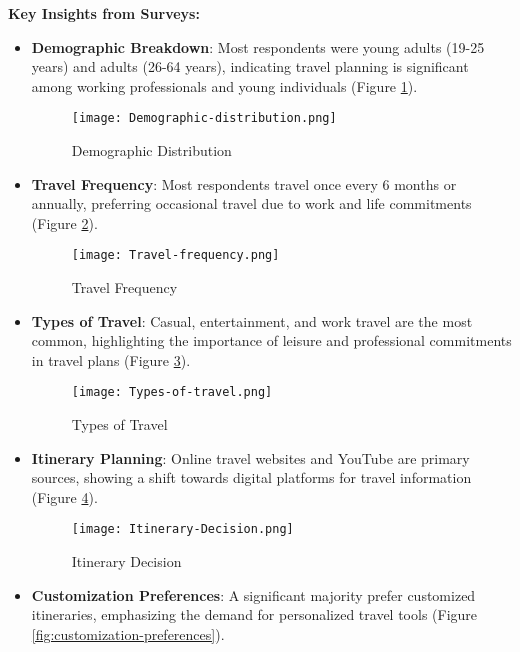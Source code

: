 \documentclass[conference]{IEEEtran}
\begin{document}
        \textbf{Key Insights from Surveys:}

        \begin{itemize}
            \item \textbf{Demographic Breakdown}: Most respondents were young adults (19-25 years) and adults (26-64 years), indicating travel planning is significant among working professionals and young individuals (Figure \ref{fig:demographic-distribution}).
            \begin{figure}
                \centering
                \texttt{[image: Demographic-distribution.png]}
                \caption{Demographic Distribution}
                \label{fig:demographic-distribution}
            \end{figure}
            \item \textbf{Travel Frequency}: Most respondents travel once every 6 months or annually, preferring occasional travel due to work and life commitments (Figure \ref{fig:travel-frequency}).
            \begin{figure}
                \centering
                \texttt{[image: Travel-frequency.png]}
                \caption{Travel Frequency}
                \label{fig:travel-frequency}
            \end{figure}
            \item \textbf{Types of Travel}: Casual, entertainment, and work travel are the most common, highlighting the importance of leisure and professional commitments in travel plans (Figure \ref{fig:types-of-travel}).
            \begin{figure}
                \centering
                \texttt{[image: Types-of-travel.png]}
                \caption{Types of Travel}
                \label{fig:types-of-travel}
            \end{figure}
            \item \textbf{Itinerary Planning}: Online travel websites and YouTube are primary sources, showing a shift towards digital platforms for travel information (Figure \ref{fig:itenary-decision}).
            \begin{figure}
                \centering
                \texttt{[image: Itinerary-Decision.png]}
                \caption{Itinerary Decision}
                \label{fig:itenary-decision}
            \end{figure}
            \item \textbf{Customization Preferences}: A significant majority prefer customized itineraries, emphasizing the demand for personalized travel tools (Figure \ref{fig:customization-preferences}).

\end{itemize}
\end{document}
